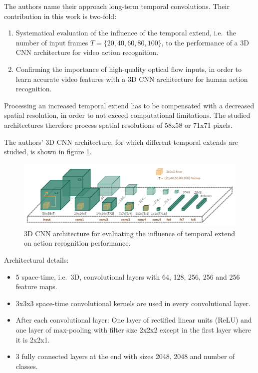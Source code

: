 The authors name their approach long-term temporal convolutions. Their contribution in this work is two-fold:
\begin{enumerate}
    \item Systematical evaluation of the influence of the temporal extend, i.e.\ the number of input frames $T = \{20, 40, 60, 80, 100\}$, to the performance of a 3D CNN architecture for video action recognition.  
    \item Confirming the importance of high-quality optical flow inputs, in order to learn accurate video features with a 3D CNN architecture for human action recognition.
\end{enumerate}

Processing an increased temporal extend has to be compensated with a decreased spatial resolution, in order to not exceed computational limitations.
The studied architectures therefore process spatial resolutions of 58x58 or 71x71 pixels.

The authors' 3D CNN architecture, for which different temporal extends are studied, is shown in figure \ref{fig:longterm_architecture}.

\begin{figure}[H]
    \centering
    \includegraphics[width=\textwidth]{img_deep/longterm_architecture}
    \caption{3D CNN architecture for evaluating the influence of temporal extend on action recognition performance. \cite{varol_long-term_2016}}
    \label{fig:longterm_architecture}
\end{figure}

Architectural details:

\begin{itemize}
    \item 5 space-time, i.e.\ 3D, convolutional layers with 64, 128, 256, 256 and 256 feature maps.
    \item 3x3x3 space-time convolutional kernels are used in every convolutional layer.
    \item After each convolutional layer: One layer of rectified linear units (ReLU) and one layer of max-pooling with filter size 2x2x2 except in the first layer where it is 2x2x1.
    \item 3 fully connected layers at the end with sizes 2048, 2048 and number of classes.
\end{itemize}

